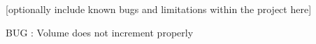 
\begin{DoxyRefList}
\item[\label{bug__bug000001}%
\hypertarget{bug__bug000001}{}%
page \hyperlink{index}{D\-Oxygen Commenting Project} ]\mbox{[}optionally include known bugs and limitations within the project here\mbox{]}
\begin{DoxyItemize}
\item B\-U\-G \-: Volume does not increment properly 
\end{DoxyItemize}
\end{DoxyRefList}